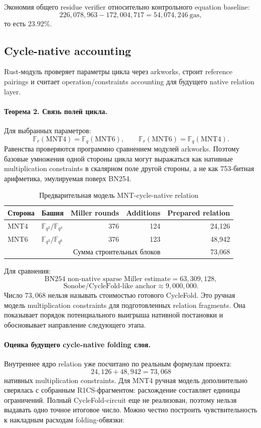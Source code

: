 \documentclass[12pt,a4paper]{article}
\newcommand{\Fq}{\mathbb{F}_q}
\newcommand{\Fr}{\mathbb{F}_r}
\newcommand{\Gas}{\mathrm{gas}}
\begin{document}
Экономия общего residue verifier относительно контрольного equation baseline:
\[
    226{,}078{,}963-172{,}004{,}717
    =54{,}074{,}246\ \Gas,
\]
то есть $23.92\%$.

\subsection{Cycle-native accounting}

Rust-модуль проверяет параметры цикла через arkworks, строит reference
pairings и считает operation/constraints accounting для будущего native
relation layer.

\paragraph{Теорема 2. Связь полей цикла.}
Для выбранных параметров:
\[
    \Fr(\mathrm{MNT4})=\Fq(\mathrm{MNT6}),
    \qquad
    \Fr(\mathrm{MNT6})=\Fq(\mathrm{MNT4}).
\]
Равенства проверяются программно сравнением модулей arkworks. Поэтому
базовые умножения одной стороны цикла могут выражаться как нативные
multiplication constraints в скалярном поле другой стороны, а не как
753-битная арифметика, эмулируемая поверх BN254.

\begin{table}[htbp]
\centering
\caption{Предварительная модель MNT-cycle-native relation}
\small
\begin{tabular}{l l r r r}
\toprule
Сторона & Башня & Miller rounds & Additions & Prepared relation \\
\midrule
MNT4 & $\mathbb{F}_{q^2}/\mathbb{F}_{q^4}$ & 376 & 124 & 24,126 \\
MNT6 & $\mathbb{F}_{q^3}/\mathbb{F}_{q^6}$ & 376 & 123 & 48,942 \\
\midrule
\multicolumn{4}{r}{Сумма строительных блоков} & 73,068 \\
\bottomrule
\end{tabular}
\end{table}

Для сравнения:
\[
    \text{BN254 non-native sparse Miller estimate}=63{,}309{,}128,
\]
\[
    \text{Sonobe/CycleFold-like anchor}\approx9{,}000{,}000.
\]
Число $73{,}068$ нельзя называть стоимостью готового CycleFold. Это ручная
модель multiplication constraints для подготовленных relation fragments.
Она показывает порядок потенциального выигрыша нативной постановки и
обосновывает направление следующего этапа.

\paragraph{Оценка будущего cycle-native folding слоя.}
Внутреннее ядро relation уже посчитано по реальным формулам проекта:
\[
    24{,}126+48{,}942=73{,}068
\]
нативных multiplication constraints. Для MNT4 ручная модель дополнительно
сверялась с собранным R1CS-фрагментом: расхождение составляет единицы
ограничений. Полный CycleFold-circuit еще не реализован, поэтому нельзя
выдавать одно точное итоговое число. Можно честно построить чувствительность
к накладным расходам folding-обвязки:
\end{document}
